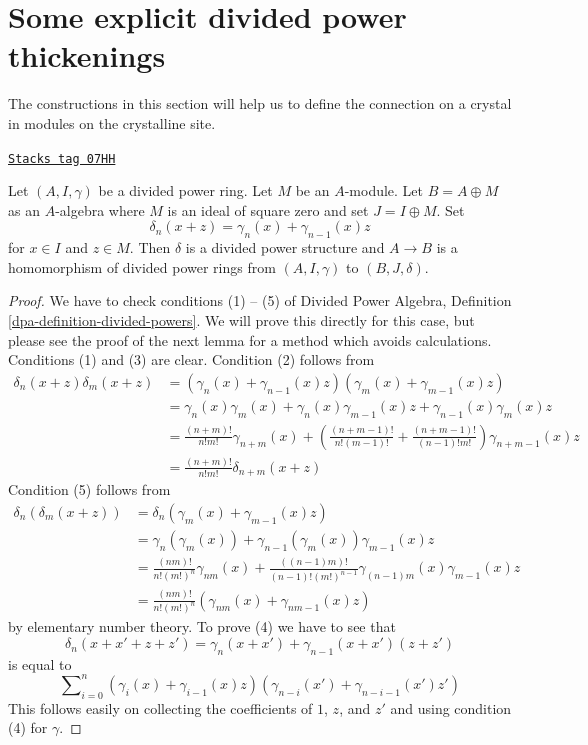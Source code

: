 \section{Some explicit divided power thickenings}
\label{crystalline-section-explicit-thickenings}
The constructions in this section will help us to define the connection
on a crystal in modules on the crystalline site.

\begin{lemma}
\label{crystalline-lemma-divided-power-first-order-thickening}
\href{https://stacks.math.columbia.edu/tag/07HH}{\texttt{Stacks tag 07HH}}

Let $(A, I, \gamma)$ be a divided power ring. Let $M$ be an $A$-module.
Let $B = A \oplus M$ as an $A$-algebra where $M$ is an ideal of square zero
and set $J = I \oplus M$. Set
$$
\delta_n(x + z) = \gamma_n(x) + \gamma_{n - 1}(x)z
$$
for $x \in I$ and $z \in M$.
Then $\delta$ is a divided power structure and
$A \to B$ is a homomorphism of divided power rings from
$(A, I, \gamma)$ to $(B, J, \delta)$.
\end{lemma}

\begin{proof}
We have to check conditions (1) -- (5) of
Divided Power Algebra, Definition \ref{dpa-definition-divided-powers}.
We will prove this directly for this case, but please see the proof of
the next lemma for a method which avoids calculations.
Conditions (1) and (3) are clear. Condition (2) follows from
\begin{align*}
\delta_n(x + z)\delta_m(x + z)
& =
(\gamma_n(x) + \gamma_{n - 1}(x)z)(\gamma_m(x) + \gamma_{m - 1}(x)z) \\
& = \gamma_n(x)\gamma_m(x) + \gamma_n(x)\gamma_{m - 1}(x)z +
\gamma_{n - 1}(x)\gamma_m(x)z \\
& =
\frac{(n + m)!}{n!m!} \gamma_{n + m}(x) +
\left(\frac{(n + m - 1)!}{n!(m - 1)!} +
\frac{(n + m - 1)!}{(n - 1)!m!}\right)
\gamma_{n + m - 1}(x) z \\
& =
\frac{(n + m)!}{n!m!}\delta_{n + m}(x + z)
\end{align*}
Condition (5) follows from
\begin{align*}
\delta_n(\delta_m(x + z))
& =
\delta_n(\gamma_m(x) + \gamma_{m - 1}(x)z) \\
& =
\gamma_n(\gamma_m(x)) + \gamma_{n - 1}(\gamma_m(x))\gamma_{m - 1}(x)z \\
& =
\frac{(nm)!}{n! (m!)^n} \gamma_{nm}(x) +
\frac{((n - 1)m)!}{(n - 1)! (m!)^{n - 1}}
\gamma_{(n - 1)m}(x) \gamma_{m - 1}(x) z \\
& = \frac{(nm)!}{n! (m!)^n}(\gamma_{nm}(x) + \gamma_{nm - 1}(x) z)
\end{align*}
by elementary number theory. To prove (4) we have to see that
$$
\delta_n(x + x' + z + z')
=
\gamma_n(x + x') + \gamma_{n - 1}(x + x')(z + z')
$$
is equal to
$$
\sum\nolimits_{i = 0}^n
(\gamma_i(x) + \gamma_{i - 1}(x)z)
(\gamma_{n - i}(x') + \gamma_{n - i - 1}(x')z')
$$
This follows easily on collecting the coefficients of
$1$, $z$, and $z'$ and using condition (4) for $\gamma$.
\end{proof}

